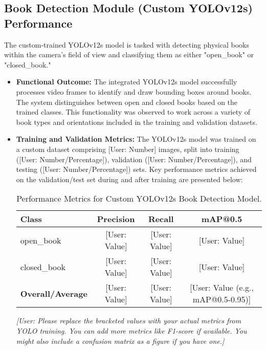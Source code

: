 \subsection{Book Detection Module (Custom YOLOv12s) Performance}
The custom-trained YOLOv12s model is tasked with detecting physical books within the camera's field of view and classifying them as either "open\_book" or "closed\_book."
\begin{itemize}
    \item \textbf{Functional Outcome:} The integrated YOLOv12s model successfully processes video frames to identify and draw bounding boxes around books. The system distinguishes between open and closed books based on the trained classes. This functionality was observed to work across a variety of book types and orientations included in the training and validation datasets.
    
    \item \textbf{Training and Validation Metrics:} The YOLOv12s model was trained on a custom dataset comprising [User: Number] images, split into training ([User: Number/Percentage]), validation ([User: Number/Percentage]), and testing ([User: Number/Percentage]) sets. Key performance metrics achieved on the validation/test set during and after training are presented below:
    
    \begin{table}[h!]
        \centering
        \caption{Performance Metrics for Custom YOLOv12s Book Detection Model.}
        \label{tab:yolo_metrics}
        \begin{tabular}{lccc}
            \hline
            \textbf{Class} & \textbf{Precision} & \textbf{Recall} & \textbf{mAP@0.5} \\ \hline
            open\_book     & [User: Value]      & [User: Value]   & [User: Value]    \\
            closed\_book   & [User: Value]      & [User: Value]   & [User: Value]    \\ \hline
            \textbf{Overall/Average} & [User: Value] & [User: Value] & [User: Value (e.g., mAP@0.5-0.95)] \\ \hline
        \end{tabular}
    \end{table}
    \textit{[User: Please replace the bracketed values with your actual metrics from YOLO training. You can add more metrics like F1-score if available. You might also include a confusion matrix as a figure if you have one.]}


\end{itemize}
